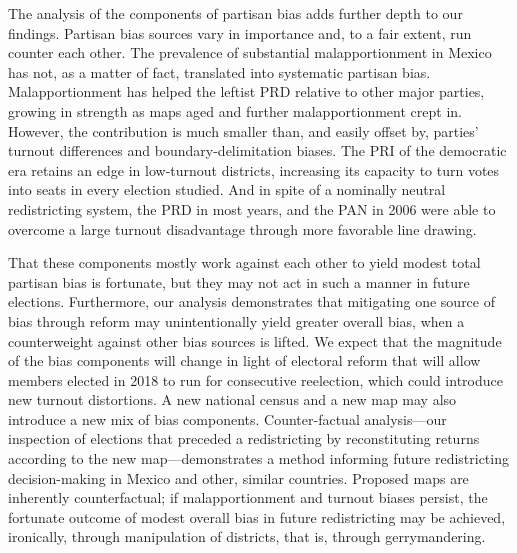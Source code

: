 \documentclass[letter,12pt]{article}
\begin{document}
The analysis of the components of partisan bias adds further depth to our findings. Partisan bias sources vary in importance and, to a fair extent, run counter each other. The prevalence of substantial malapportionment in Mexico has not, as a matter of fact, translated into systematic partisan bias. Malapportionment has helped the leftist PRD relative to other major parties, growing in strength as maps aged and further malapportionment crept in. However, the contribution is much smaller than, and easily offset by, parties' turnout differences and boundary-delimitation biases. The PRI of the democratic era retains an edge in low-turnout districts, increasing its capacity to turn votes into seats in every election studied. And in spite of a nominally neutral redistricting system, the PRD in most years, and the PAN in 2006 were able to overcome a large turnout disadvantage through more favorable line drawing. 

That these components mostly work against each other to yield modest total partisan bias is fortunate, but they may not act in such a manner in future elections. Furthermore, our analysis demonstrates that mitigating one source of bias through reform may unintentionally yield greater overall bias, when a counterweight against other bias sources is lifted. We expect that the magnitude of the bias components will change in light of electoral reform that will allow members elected in 2018 to run for consecutive reelection, which could introduce new turnout distortions. A new national census and a new map may also introduce a new mix of bias components. Counter-factual analysis---our inspection of elections that preceded a redistricting by reconstituting returns according to the new map---demonstrates a method informing future redistricting decision-making in Mexico and other, similar countries. Proposed maps are inherently counterfactual; if malapportionment and turnout biases persist, the fortunate outcome of modest overall bias in future redistricting may be achieved, ironically, through manipulation of districts, that is, through gerrymandering.


\end{document}
